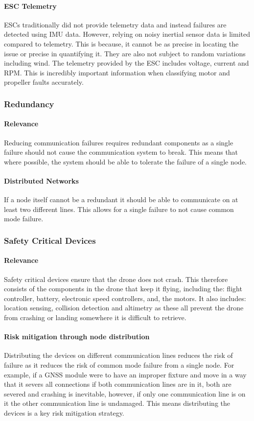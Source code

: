 \paragraph{\gls{ESC} Telemetry}
\gls{ESC}s traditionally did not provide telemetry data and instead failures are detected using \gls{IMU} data. However, relying on noisy inertial sensor data is limited compared to telemetry. This is because, it cannot be as precise in locating the issue or precise in quantifying it. They are also not subject to random variations including wind. The telemetry provided by the \gls{ESC} includes voltage, current and \gls{RPM}. This is incredibly important information when classifying motor and propeller faults accurately.   

\subsubsection{Redundancy}
\paragraph{Relevance}
Reducing communication failures requires redundant components as a single failure should not cause the communication system to break. This means that where possible, the system should be able to tolerate the failure of a single node.
\paragraph{Distributed Networks}
If a node itself cannot be a redundant it should be able to communicate on at least two different lines. This allows for a single failure to not cause common mode failure.

\subsubsection{Safety Critical Devices}
\paragraph{Relevance}
Safety critical devices ensure that the drone does not crash. This therefore consists of the components in the drone that keep it flying, including the: flight controller, battery, electronic speed controllers, and, the motors. It also includes: location sensing,  collision detection and altimetry as these all prevent the drone from crashing or landing somewhere it is difficult to retrieve.
\paragraph{Risk mitigation through node distribution}
Distributing the devices on different communication lines reduces the risk of failure as it reduces the risk of common mode failure from a single node. For example, if a \gls{GNSS} module were to have an improper fixture and move in a way that it severs all connections if both communication lines are in it, both are severed and crashing is inevitable, however, if only one communication line is on it the other communication line is undamaged. This means distributing the devices is a key risk mitigation strategy.

